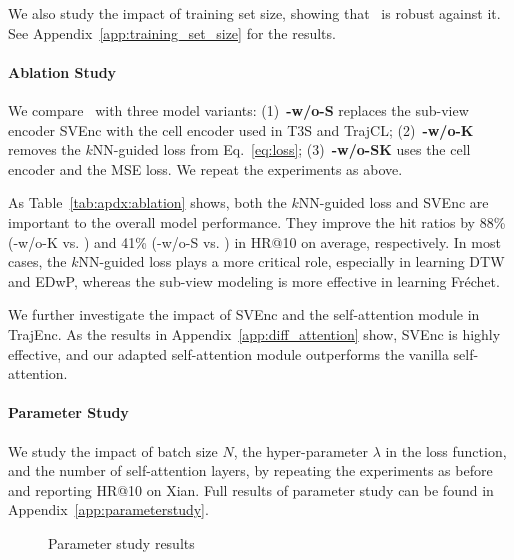 We also study the impact of training set size, showing that \model\ is robust against it.  See Appendix~\ref{app:training_set_size} for the results. 

\paragraph{Ablation Study }\label{subsec:exp:ablation}

We compare \model\ with three model variants: 
(1)~\textbf{\model-w/o-S} replaces the sub-view encoder SVEnc with the cell encoder used in T3S and TrajCL;
(2)~\textbf{\model-w/o-K} removes the $k$NN-guided loss from Eq.~\eqref{eq:loss};
(3)~\textbf{\model-w/o-SK} uses the cell encoder and the MSE loss. 
We repeat the experiments as above.


As Table~\ref{tab:apdx:ablation} shows, both the $k$NN-guided loss and SVEnc 
are important to the overall model performance. They improve the hit ratios by 88\% (\model-w/o-K vs. \model) and 41\% (\model-w/o-S vs. \model) in HR@10 on average, respectively.
In most cases, the $k$NN-guided loss plays a more critical role, especially in learning DTW and EDwP, whereas the sub-view modeling is more effective in learning Fr\'echet.

We further investigate the impact of SVEnc and the self-attention module in TrajEnc. As the results in Appendix~\ref{app:diff_attention} show, SVEnc is highly effective, and our adapted self-attention module outperforms the vanilla self-attention.



\paragraph{Parameter Study}\label{subsec:exp:parameter}
We study the impact of  batch size $N$, the hyper-parameter $\lambda$ in the loss function, and the number of self-attention layers, by
repeating the experiments as before and reporting HR@10 on Xian. 
Full results of parameter study can be found in Appendix~\ref{app:parameterstudy}.

\begin{figure}[ht]
    \centering
    \vspace{-5mm}
    \hspace*{-2mm}
    \vspace{-2mm}
    \caption{Parameter study results}\label{fig:paramstudy}
    \vspace{-3mm}
\end{figure}

